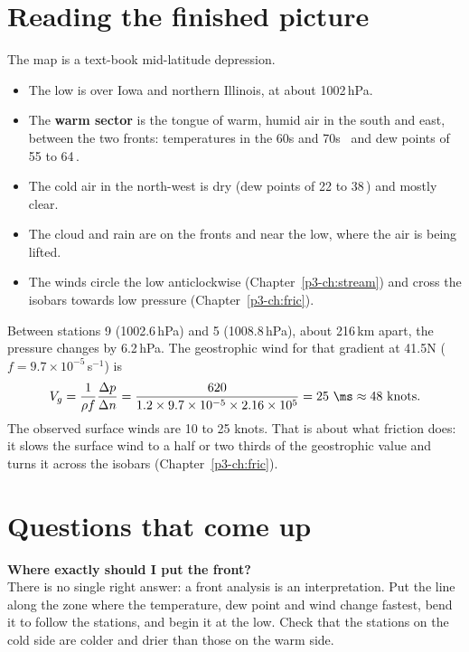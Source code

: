 \section{Reading the finished picture}

The map is a text-book mid-latitude depression.
\begin{itemize}
\item The low is over Iowa and northern Illinois, at about 1002\,hPa.
\item The \textbf{warm sector} is the tongue of warm, humid air in the south and east, between the two fronts: temperatures in the 60s and 70s \degF\ and dew points of 55 to 64\,\degF.
\item The cold air in the north-west is dry (dew points of 22 to 38\,\degF) and mostly clear.
\item The cloud and rain are on the fronts and near the low, where the air is being lifted.
\item The winds circle the low anticlockwise (Chapter~\ref{p3-ch:stream}) and cross the isobars towards low pressure (Chapter~\ref{p3-ch:fric}).
\end{itemize}

\begin{workedbox}
Between stations 9 (1002.6\,hPa) and 5 (1008.8\,hPa), about 216\,km apart, the pressure changes by 6.2\,hPa. The geostrophic wind for that gradient at 41.5\deg N ($f=9.7\times10^{-5}$\,s$^{-1}$) is
\[
V_g=\frac{1}{\rho f}\frac{\Delta p}{\Delta n}=\frac{620}{1.2\times9.7\times10^{-5}\times2.16\times10^{5}}=25\ \ms\approx48\ \text{knots}.
\]
The observed surface winds are 10 to 25 knots. That is about what friction does: it slows the surface wind to a half or two thirds of the geostrophic value and turns it across the isobars (Chapter~\ref{p3-ch:fric}).
\end{workedbox}

\section{Questions that come up}

\begin{askbox}
\textbf{Where exactly should I put the front?}\\
There is no single right answer: a front analysis is an interpretation. Put the line along the zone where the temperature, dew point and wind change fastest, bend it to follow the stations, and begin it at the low. Check that the stations on the cold side are colder and drier than those on the warm side.
\end{askbox}

